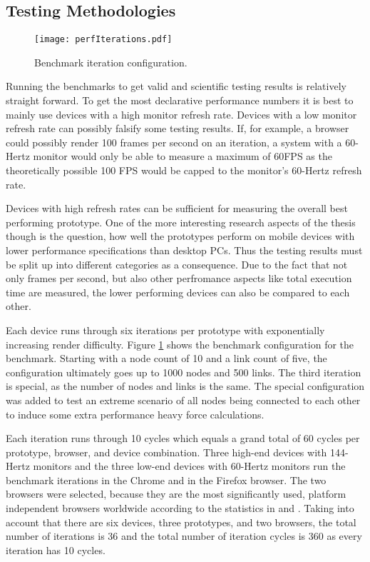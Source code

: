 \subsection{Testing Methodologies}

\begin{figure}
\centering
\texttt{[image: perfIterations.pdf]}
\caption{Benchmark iteration configuration.}
\label{fig:perfIterations}
\end{figure}

Running the benchmarks to get valid and scientific testing results is relatively straight forward. To get the most declarative performance numbers it is best to mainly use devices with a high monitor refresh rate. Devices with a low monitor refresh rate can possibly falsify some testing results. If, for example, a browser could possibly render 100 frames per second on an iteration, a system with a 60-Hertz monitor would only be able to measure a maximum of 60FPS as the theoretically possible 100 FPS would be capped to the monitor's 60-Hertz refresh rate.

Devices with high refresh rates can be sufficient for measuring the overall best performing prototype. One of the more interesting research aspects of the thesis though is the question, how well the prototypes perform on mobile devices with lower performance specifications than desktop PCs. Thus the testing results must be split up into different categories as a consequence. Due to the fact that not only frames per second, but also other perfromance aspects like total execution time are measured, the lower performing devices can also be compared to each other.

Each device runs through six iterations per prototype with exponentially increasing render difficulty. Figure \ref{fig:perfIterations} shows the benchmark configuration for the benchmark. Starting with a node count of 10 and a link count of five, the configuration ultimately goes up to 1000 nodes and 500 links. The third iteration is special, as the number of nodes and links is the same. The special configuration was added to test an extreme scenario of all nodes being connected to each other to induce some extra performance heavy force calculations.

Each iteration runs through 10 cycles which equals a grand total of 60 cycles per prototype, browser, and device combination. Three high-end devices with 144-Hertz monitors and the three low-end devices with 60-Hertz monitors run the benchmark iterations in the Chrome and in the Firefox browser. The two browsers were selected, because they are the most significantly used, platform independent browsers worldwide according to the statistics in \cite{StatCounterBrowserMarketShare} and \cite{W3CBrowserMarketShare}. Taking into account that there are six devices, three prototypes, and two browsers, the total number of iterations is 36 and the total number of iteration cycles is 360 as every iteration has 10 cycles.

